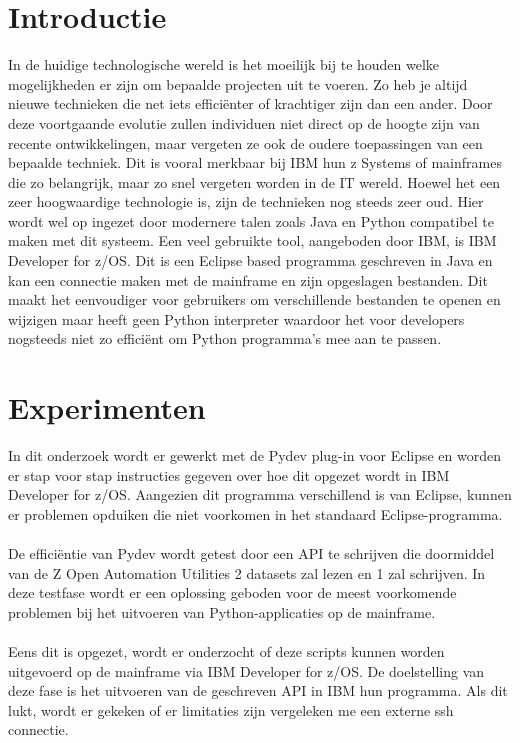 \documentclass[a0,portrait]{hogent-poster}
\begin{document}
\begin{multicols}{2} %

\section{Introductie}

In de huidige technologische wereld is het moeilijk
bij te houden welke mogelijkheden er zijn om
bepaalde projecten uit te voeren. Zo heb je altijd
nieuwe technieken die net iets efficiënter of
krachtiger zijn dan een ander. Door deze voortgaande
evolutie zullen individuen niet direct op
de hoogte zijn van recente ontwikkelingen, maar
vergeten ze ook de oudere toepassingen van een
bepaalde techniek. Dit is vooral merkbaar bij IBM
hun z Systems of mainframes die zo belangrijk,
maar zo snel vergeten worden in de IT wereld.
Hoewel het een zeer hoogwaardige technologie
is, zijn de technieken nog steeds zeer oud. Hier
wordt wel op ingezet door modernere talen zoals
Java en Python compatibel te maken met dit systeem.
Een veel gebruikte tool, aangeboden door
IBM, is IBM Developer for z/OS. Dit is een Eclipse
based programma geschreven in Java en kan een
connectie maken met de mainframe en zijn opgeslagen
bestanden. Dit maakt het eenvoudiger
voor gebruikers om verschillende bestanden
te openen en wijzigen maar heeft geen Python
interpreter waardoor het voor developers nogsteeds
niet zo efficiënt om Python programma’s mee aan te passen.

\section{Experimenten}

In dit onderzoek wordt er gewerkt met de Pydev plug-in voor Eclipse en worden er
stap voor stap instructies gegeven over hoe dit opgezet wordt in IBM Developer for
z/OS. Aangezien dit programma verschillend is van Eclipse, kunnen er problemen
opduiken die niet voorkomen in het standaard Eclipse-programma. \\ \\
De efficiëntie van Pydev wordt getest door een API te schrijven die doormiddel van de Z Open Automation Utilities 2 datasets zal lezen en 1 zal
schrijven. In deze testfase wordt er een oplossing geboden voor de meest voorkomende problemen bij het uitvoeren van Python-applicaties op de mainframe. \\ \\
Eens dit is opgezet, wordt er onderzocht of deze scripts kunnen worden uitgevoerd op de mainframe via IBM Developer for z/OS. De doelstelling van deze fase is het uitvoeren van de geschreven API in IBM hun programma. Als dit lukt, wordt er gekeken of er limitaties zijn vergeleken me een externe ssh connectie.  


\end{multicols}
\end{document}
